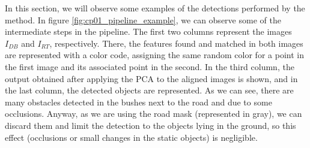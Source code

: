 In this section, we will observe some examples of the detections performed by the method. In figure \ref{fig:cp01_pipeline_example}, we can observe some of the intermediate steps in the pipeline. The first two columns represent the images $I_{DB}$ and $I_{RT}$, respectively. There, the features found and matched in both images are represented with a color code, assigning the same random color for a point in the first image and its associated point in the second. In the third column, the output obtained after applying the \ac{PCA} to the aligned images is shown, and in the last column, the detected objects are represented. As we can see, there are many obstacles detected in the bushes next to the road and due to some occlusions. Anyway, as we are using the road mask (represented in gray), we can discard them and limit the detection to the objects lying in the ground, so this effect (occlusions or small changes in the static objects) is negligible.

